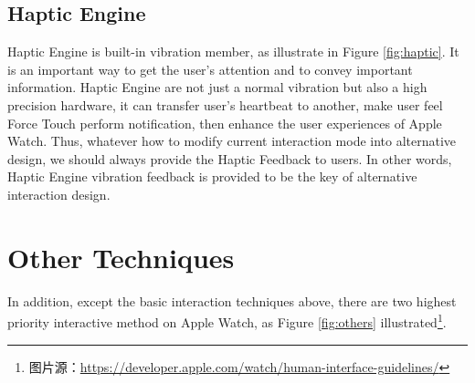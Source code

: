 \subsection{Haptic Engine}

Haptic Engine is built-in vibration member, as illustrate in Figure \ref{fig:haptic}.
It is an important way to get the user's attention and to convey important information.
Haptic Engine are not just a normal vibration but also a high precision hardware, it can transfer user's heartbeat to another, make user feel Force Touch perform notification, then enhance the user experiences of Apple Watch.
Thus, whatever how to modify current interaction mode into alternative design, we should always provide the Haptic Feedback to users.
In other words, Haptic Engine vibration feedback is provided to be the key of alternative interaction design.

\section{Other Techniques}

In addition, except the basic interaction techniques above, there are two highest priority interactive method on Apple Watch, as Figure \ref{fig:others} illustrated\footnote{图片源：\url{https://developer.apple.com/watch/human-interface-guidelines/}}.

